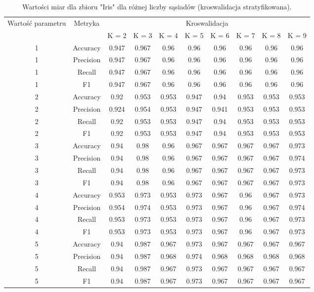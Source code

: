 
\begin{table}[H]
    \begin{tabular}{c|c|cccccccc}
       \multirow{2}{*}{Wartość parametru} & \multirow{2}{*}{Metryka} & \multicolumn{8}{|c|}{Kroswalidacja} \\
         & & K = 2 & K = 3 & K = 4 & K = 5 & K = 6 & K = 7 & K = 8 & K = 9 \\ \hline
         1&Accuracy&0.947& 0.967& 0.96& 0.96& 0.96& 0.96& 0.96& 0.96\\ \hline
1&Precision&0.947& 0.967& 0.96& 0.96& 0.96& 0.96& 0.96& 0.96\\ \hline
1&Recall&0.947& 0.967& 0.96& 0.96& 0.96& 0.96& 0.96& 0.96\\ \hline
1&F1&0.947& 0.967& 0.96& 0.96& 0.96& 0.96& 0.96& 0.96\\ \hline
2&Accuracy&0.92& 0.953& 0.953& 0.947& 0.94& 0.953& 0.953& 0.953\\ \hline
2&Precision&0.924& 0.954& 0.953& 0.947& 0.941& 0.953& 0.953& 0.953\\ \hline
2&Recall&0.92& 0.953& 0.953& 0.947& 0.94& 0.953& 0.953& 0.953\\ \hline
2&F1&0.92& 0.953& 0.953& 0.947& 0.94& 0.953& 0.953& 0.953\\ \hline
3&Accuracy&0.94& 0.98& 0.96& 0.967& 0.967& 0.967& 0.967& 0.973\\ \hline
3&Precision&0.94& 0.98& 0.96& 0.967& 0.967& 0.967& 0.967& 0.974\\ \hline
3&Recall&0.94& 0.98& 0.96& 0.967& 0.967& 0.967& 0.967& 0.973\\ \hline
3&F1&0.94& 0.98& 0.96& 0.967& 0.967& 0.967& 0.967& 0.973\\ \hline
4&Accuracy&0.953& 0.973& 0.953& 0.973& 0.967& 0.96& 0.967& 0.973\\ \hline
4&Precision&0.954& 0.974& 0.953& 0.973& 0.967& 0.96& 0.967& 0.974\\ \hline
4&Recall&0.953& 0.973& 0.953& 0.973& 0.967& 0.96& 0.967& 0.973\\ \hline
4&F1&0.953& 0.973& 0.953& 0.973& 0.967& 0.96& 0.967& 0.973\\ \hline
5&Accuracy&0.94& 0.987& 0.967& 0.973& 0.967& 0.967& 0.967& 0.967\\ \hline
5&Precision&0.94& 0.987& 0.968& 0.974& 0.968& 0.968& 0.968& 0.968\\ \hline
5&Recall&0.94& 0.987& 0.967& 0.973& 0.967& 0.967& 0.967& 0.967\\ \hline
5&F1&0.94& 0.987& 0.967& 0.973& 0.967& 0.967& 0.967& 0.967 \\ \hline
    \end{tabular}
    \caption{Wartości miar dla zbioru "Iris" dla różnej liczby sąsiadów (kroswalidacja stratyfikowana).}
\end{table}
    